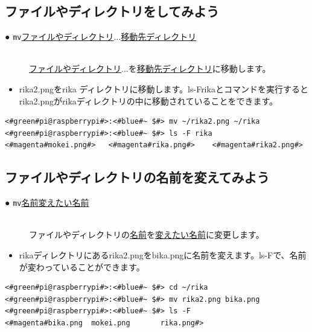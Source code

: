 \documentclass[text03.tex]{subfiles}
\begin{document}
\newpage
\subsection{ファイルやディレクトリをしてみよう}
\begin{description}
\item[● \texttt{mv}\textvisiblespace \underline{ファイルやディレクトリ}$\ldots$\textvisiblespace \underline{移動先ディレクトリ}]\mbox{}\\
\underline{ファイルやディレクトリ}$\ldots$を\underline{移動先ディレクトリ}に移動します。
\end{description}
\begin{itemize}
\item[<例>]rika2.pngをrika ディレクトリに移動します。ls\textvisiblespace -F\textvisiblespace rikaとコマンドを実行するとrika2.pngがrikaディレクトリの中に移動されていることをできます。
\end{itemize}
\begin{lstlisting}[caption=mvの例, label=mv]
<#green#pi@raspberrypi#>:<#blue#~ $#> mv ~/rika2.png ~/rika
<#green#pi@raspberrypi#>:<#blue#~ $#> ls -F rika
<#magenta#mokei.png#>	<#magenta#rika.png#>	<#magenta#rika2.png#>
\end{lstlisting}


\subsection{ファイルやディレクトリの名前を変えてみよう}
\begin{description}
\item[● \texttt{mv}\textvisiblespace \underline{名前}\textvisiblespace \underline{変えたい名前}]\mbox{}\\
ファイルやディレクトリの\underline{名前}を\underline{変えたい名前}に変更します。
\end{description}
\begin{itemize}
\item[<例>]rikaディレクトリにあるrika2.pngをbika.pngに名前を変えます。ls\textvisiblespace -Fで、名前が変わっていることができます。
\end{itemize}
\begin{lstlisting}[caption=ファイル名を変える, label=mvName]
<#green#pi@raspberrypi#>:<#blue#~ $#> cd ~/rika
<#green#pi@raspberrypi#>:<#blue#~ $#> mv rika2.png bika.png
<#green#pi@raspberrypi#>:<#blue#~ $#> ls -F
<#magenta#bika.png	mokei.png		rika.png#>
\end{lstlisting}
\end{document}
